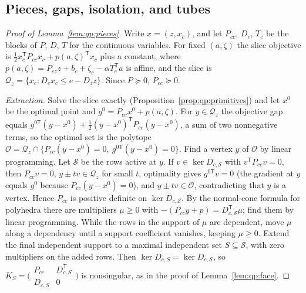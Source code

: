 \subsection{Pieces, gaps, isolation, and tubes}

\begin{proof}[Proof of Lemma~\ref{lem:qp:pieces}]
Write $x=(z,x_c)$, and let $P_{cc}$, $D_c$, $T_c$ be the blocks of $P$, $D$, $T$
for the continuous variables. For fixed $(a,\zeta)$ the slice objective is
$\frac12x_c^{\mathsf T} P_{cc}x_c+p(a,\zeta)^{\mathsf T} x_c$ plus a constant, where
$p(a,\zeta)=P_{cz}z+b_c+\zeta_c-\alpha T_c^{\mathsf T} a$ is affine, and the slice is
$\mathcal Q_z=\{x_c:D_cx_c\le e-D_zz\}$. Since $P\succeq0$, $P_{cc}\succeq0$.

\emph{Extraction.} Solve the slice exactly
(Proposition~\ref{prop:qp:primitives}) and let $x^0$ be the optimal point and
$g^0=P_{cc}x^0+p(a,\zeta)$. For $y\in\mathcal Q_z$ the objective gap equals
$g^{0\mathsf T}(y-x^0)+\frac12(y-x^0)^{\mathsf T} P_{cc}(y-x^0)$, a sum of two nonnegative
terms, so the optimal set is the polytope
$\mathcal O=\mathcal Q_z\cap\{P_{cc}(y-x^0)=0,\ g^{0\mathsf T}(y-x^0)=0\}$. Find a vertex
$y$ of $\mathcal O$ by linear programming. Let $\mathcal S$ be the rows active at
$y$. If $v\in\ker D_{c,\mathcal S}$ with $v^{\mathsf T} P_{cc}v=0$, then $P_{cc}v=0$,
$y\pm tv\in\mathcal Q_z$ for small $t$, optimality gives $g^{0\mathsf T}v=0$ (the
gradient at $y$ equals $g^0$ because $P_{cc}(y-x^0)=0$), and $y\pm tv\in\mathcal O$,
contradicting that $y$ is a vertex. Hence $P_{cc}$ is positive definite on
$\ker D_{c,\mathcal S}$. By the normal-cone formula for polyhedra there are
multipliers $\mu\ge0$ with $-(P_{cc}y+p)=D_{c,\mathcal S}^{\mathsf T}\mu$; find them by
linear programming. While the rows in the support of $\mu$ are dependent, move
$\mu$ along a dependency until a support coefficient vanishes, keeping
$\mu\ge0$. Extend the final independent support to a maximal independent set
$S\subseteq\mathcal S$, with zero multipliers on the added rows. Then
$\ker D_{c,S}=\ker D_{c,\mathcal S}$, so
$K_S=\bigl(\begin{smallmatrix}P_{cc}&D_{c,S}^{\mathsf T}\\D_{c,S}&0\end{smallmatrix}\bigr)$
is nonsingular, as in the proof of Lemma~\ref{lem:qp:face}.


\end{proof}

